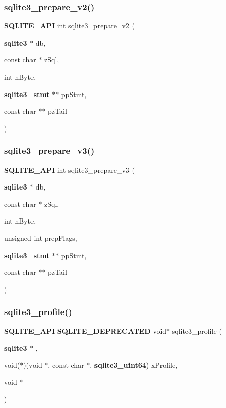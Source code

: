 \mbox{\label{sqlite3_8h_a85d4203bb54c984c5325c2f5b3664985}} 
\subsubsection{sqlite3\_prepare\_v2()}
{\footnotesize\ttfamily \textbf{ S\+Q\+L\+I\+T\+E\+\_\+\+A\+PI} int sqlite3\+\_\+prepare\+\_\+v2 (\begin{DoxyParamCaption}\item[{\textbf{ sqlite3} $\ast$}]{db,  }\item[{const char $\ast$}]{z\+Sql,  }\item[{int}]{n\+Byte,  }\item[{\textbf{ sqlite3\+\_\+stmt} $\ast$$\ast$}]{pp\+Stmt,  }\item[{const char $\ast$$\ast$}]{pz\+Tail }\end{DoxyParamCaption})}

\mbox{\label{sqlite3_8h_a02642a760622a5975ee83bdb9cb3e635}} 
\subsubsection{sqlite3\_prepare\_v3()}
{\footnotesize\ttfamily \textbf{ S\+Q\+L\+I\+T\+E\+\_\+\+A\+PI} int sqlite3\+\_\+prepare\+\_\+v3 (\begin{DoxyParamCaption}\item[{\textbf{ sqlite3} $\ast$}]{db,  }\item[{const char $\ast$}]{z\+Sql,  }\item[{int}]{n\+Byte,  }\item[{unsigned int}]{prep\+Flags,  }\item[{\textbf{ sqlite3\+\_\+stmt} $\ast$$\ast$}]{pp\+Stmt,  }\item[{const char $\ast$$\ast$}]{pz\+Tail }\end{DoxyParamCaption})}

\mbox{\label{sqlite3_8h_ab9d5f0a6e8a58c2e0aac9ed85a23e4a9}} 
\subsubsection{sqlite3\_profile()}
{\footnotesize\ttfamily \textbf{ S\+Q\+L\+I\+T\+E\+\_\+\+A\+PI} \textbf{ S\+Q\+L\+I\+T\+E\+\_\+\+D\+E\+P\+R\+E\+C\+A\+T\+ED} void$\ast$ sqlite3\+\_\+profile (\begin{DoxyParamCaption}\item[{\textbf{ sqlite3} $\ast$}]{,  }\item[{void($\ast$)(void $\ast$, const char $\ast$, \textbf{ sqlite3\+\_\+uint64})}]{x\+Profile,  }\item[{void $\ast$}]{ }\end{DoxyParamCaption})}

